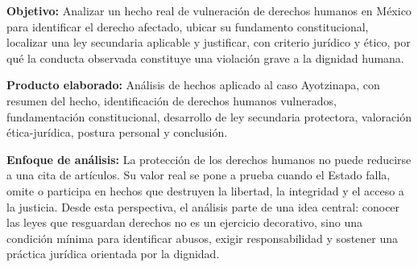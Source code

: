\documentclass[
	spanish,
	letterpaper, oneside
]{article}
\begin{document}
\templatePortrait

\templatePagecfg
\onehalfspacing

\begin{abstractd}
	\textbf{Objetivo:} Analizar un hecho real de vulneración de derechos humanos en México para identificar el derecho afectado, ubicar su fundamento constitucional, localizar una ley secundaria aplicable y justificar, con criterio jurídico y ético, por qué la conducta observada constituye una violación grave a la dignidad humana.

	\textbf{Producto elaborado:} Análisis de hechos aplicado al caso Ayotzinapa, con resumen del hecho, identificación de derechos humanos vulnerados, fundamentación constitucional, desarrollo de ley secundaria protectora, valoración ética-jurídica, postura personal y conclusión.

	\textbf{Enfoque de análisis:} La protección de los derechos humanos no puede reducirse a una cita de artículos. Su valor real se pone a prueba cuando el Estado falla, omite o participa en hechos que destruyen la libertad, la integridad y el acceso a la justicia. Desde esta perspectiva, el análisis parte de una idea central: conocer las leyes que resguardan derechos no es un ejercicio decorativo, sino una condición mínima para identificar abusos, exigir responsabilidad y sostener una práctica jurídica orientada por la dignidad.
\end{abstractd}

\templateIndex

\templateFinalcfg


%
\end{document}
